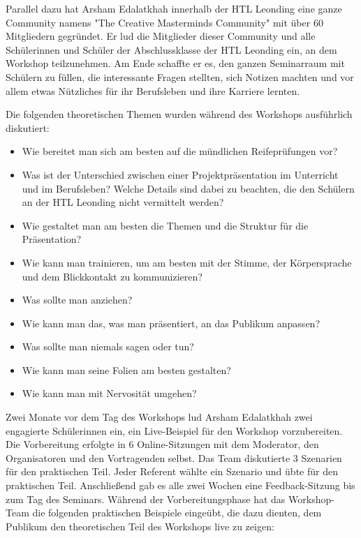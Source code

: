 Parallel dazu hat Arsham Edalatkhah innerhalb der HTL Leonding eine ganze Community namens "The Creative Masterminds Community" mit über 60 Mitgliedern gegründet. Er lud die Mitglieder dieser Community und alle Schülerinnen und Schüler der Abschlussklasse der HTL Leonding ein, an dem Workshop teilzunehmen. Am Ende schaffte er es, den ganzen Seminarraum mit Schülern zu füllen, die interessante Fragen stellten, sich Notizen machten und vor allem etwas Nützliches für ihr Berufsleben und ihre Karriere lernten.

Die folgenden theoretischen Themen wurden während des Workshops ausführlich diskutiert:


\begin{itemize}
    \item {Wie bereitet man sich am besten auf die mündlichen Reifeprüfungen vor?}
    \item {Was ist der Unterschied zwischen einer Projektpräsentation im Unterricht und im Berufsleben? Welche Details sind dabei zu beachten, die den Schülern an der HTL Leonding nicht vermittelt werden?}
    \item {Wie gestaltet man am besten die Themen und die Struktur für die Präsentation?}
    \item {Wie kann man trainieren, um am besten mit der Stimme, der Körpersprache und dem Blickkontakt zu kommunizieren?}
    \item {Was sollte man anziehen?}
    \item {Wie kann man das, was man präsentiert, an das Publikum anpassen?}
    \item {Was sollte man niemals sagen oder tun?}
    \item {Wie kann man seine Folien am besten gestalten?}
    \item {Wie kann man mit Nervosität umgehen?}
\end{itemize}

Zwei Monate vor dem Tag des Workshops lud Arsham Edalatkhah zwei engagierte Schülerinnen ein, ein Live-Beispiel für den Workshop vorzubereiten. Die Vorbereitung erfolgte in 6 Online-Sitzungen mit dem Moderator, den Organisatoren und den Vortragenden selbst. Das Team diskutierte 3 Szenarien für den praktischen Teil. Jeder Referent wählte ein Szenario und übte für den praktischen Teil. Anschließend gab es alle zwei Wochen eine Feedback-Sitzung bis zum Tag des Seminars. Während der Vorbereitungsphase hat das Workshop-Team die folgenden praktischen Beispiele eingeübt, die dazu dienten, dem Publikum den theoretischen Teil des Workshops live zu zeigen:

